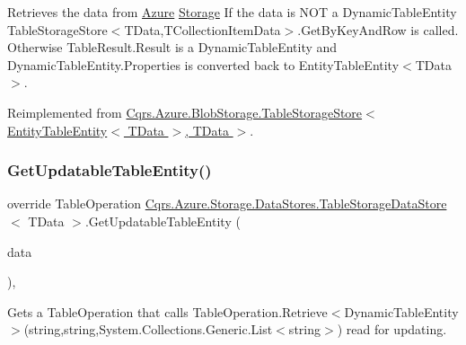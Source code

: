 Retrieves the data from \hyperlink{namespaceCqrs_1_1Azure}{Azure} \hyperlink{namespaceCqrs_1_1Azure_1_1Storage}{Storage} If the data is N\+OT a Dynamic\+Table\+Entity Table\+Storage\+Store$<$\+T\+Data,\+T\+Collection\+Item\+Data$>$.\+Get\+By\+Key\+And\+Row is called. Otherwise Table\+Result.\+Result is a Dynamic\+Table\+Entity and Dynamic\+Table\+Entity.\+Properties is converted back to Entity\+Table\+Entity$<$\+T\+Data$>$. 



Reimplemented from \hyperlink{classCqrs_1_1Azure_1_1BlobStorage_1_1TableStorageStore_ab7c4ae1a7b13e6bd1c36c242b753edba_ab7c4ae1a7b13e6bd1c36c242b753edba}{Cqrs.\+Azure.\+Blob\+Storage.\+Table\+Storage\+Store$<$ Entity\+Table\+Entity$<$ T\+Data $>$, T\+Data $>$}.

\mbox{\label{classCqrs_1_1Azure_1_1Storage_1_1DataStores_1_1TableStorageDataStore_a54f00f53521e285568f19c29527d6466_a54f00f53521e285568f19c29527d6466}} 
\subsubsection{\texorpdfstring{Get\+Updatable\+Table\+Entity()}{GetUpdatableTableEntity()}}
{\footnotesize\ttfamily override Table\+Operation \hyperlink{classCqrs_1_1Azure_1_1Storage_1_1DataStores_1_1TableStorageDataStore}{Cqrs.\+Azure.\+Storage.\+Data\+Stores.\+Table\+Storage\+Data\+Store}$<$ T\+Data $>$.Get\+Updatable\+Table\+Entity (\begin{DoxyParamCaption}\item[{T\+Data}]{data }\end{DoxyParamCaption})\hspace{0.3cm}{\ttfamily [protected]}, {\ttfamily [virtual]}}



Gets a Table\+Operation that calls Table\+Operation.\+Retrieve$<$\+Dynamic\+Table\+Entity$>$(string,string,\+System.\+Collections.\+Generic.\+List$<$string$>$) read for updating. 


